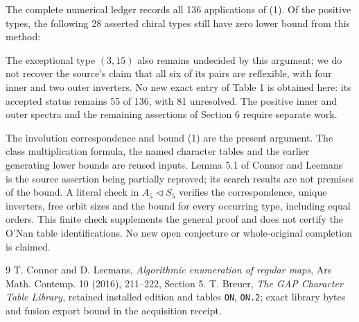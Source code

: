 \documentclass[11pt,a4paper]{article}
\begin{document}
The complete numerical ledger records all 136 applications of (1).
Of the positive types, the following 28 asserted chiral types still
have zero lower bound from this method:

The exceptional type $(3,15)$ also remains undecided by this argument;
we do not recover the source's claim that all six of its pairs are
reflexible, with four inner and two outer inverters. No new exact
entry of Table 1 is obtained here: its accepted status remains
55 of 136, with 81 unresolved. The positive inner and outer spectra
and the remaining assertions of Section 6 require separate work.

The involution correspondence and bound (1) are the present argument.
The class multiplication formula, the named character tables and the
earlier generating lower bounds are reused inputs. Lemma 5.1 of
Connor and Leemans~\cite{CL} is the source assertion being partially
reproved; its search results are not premises of the bound. A literal
check in $A_5\lhd S_5$ verifies the correspondence, unique inverters,
free orbit sizes and the bound for every occurring type, including
equal orders. This finite check supplements the general proof and
does not certify the O'Nan table identifications. No new open
conjecture or whole-original completion is claimed.
\begin{thebibliography}{9}
 T. Connor and D. Leemans, \emph{Algorithmic enumeration of
regular maps}, Ars Math. Contemp. 10 (2016), 211--222, Section 5.
 T. Breuer, \emph{The GAP Character Table Library},
retained installed edition and tables \texttt{ON}, \texttt{ON.2};
exact library bytes and fusion export bound in the acquisition receipt.
\end{thebibliography}
\end{document}
